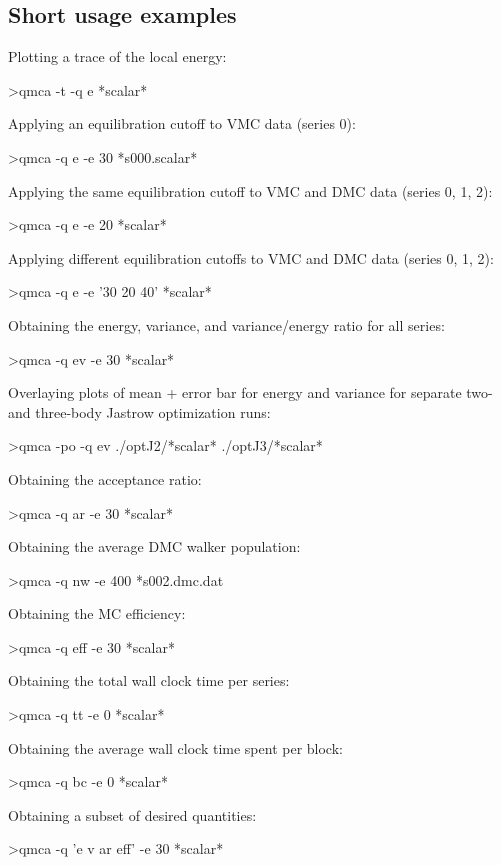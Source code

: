 \subsection{Short usage examples}
\label{sec:qmca_short_examples}
\noindent
Plotting a trace of the local energy:
\begin{shade}
>qmca -t -q e *scalar*
\end{shade}
\noindent
Applying an equilibration cutoff to VMC data (series 0):
\begin{shade}
>qmca -q e -e 30 *s000.scalar*
\end{shade}
\noindent
Applying the same equilibration cutoff to VMC and DMC data (series 0, 1, 2):
\begin{shade}
>qmca -q e -e 20 *scalar*
\end{shade}
\noindent
Applying different equilibration cutoffs to VMC and DMC data (series 0, 1, 2):
\begin{shade}
>qmca -q e -e '30 20 40' *scalar*
\end{shade}
\noindent
Obtaining the energy, variance, and variance/energy ratio for all series:
\begin{shade}
>qmca -q ev -e 30 *scalar*
\end{shade}
\noindent
Overlaying plots of mean + error bar for energy and variance for separate 
two- and three-body Jastrow optimization runs:
\begin{shade}
>qmca -po -q ev ./optJ2/*scalar* ./optJ3/*scalar*
\end{shade}
\noindent
Obtaining the acceptance ratio:
\begin{shade}
>qmca -q ar -e 30 *scalar*
\end{shade}
\noindent
Obtaining the average DMC walker population:
\begin{shade}
>qmca -q nw -e 400 *s002.dmc.dat
\end{shade}
\noindent
Obtaining the MC efficiency:
\begin{shade}
>qmca -q eff -e 30 *scalar*
\end{shade}
\noindent
Obtaining the total wall clock time per series:
\begin{shade}
>qmca -q tt -e 0 *scalar*
\end{shade}
\noindent
Obtaining the average wall clock time spent per block:
\begin{shade}
>qmca -q bc -e 0 *scalar*
\end{shade}
\noindent
Obtaining a subset of desired quantities:
\begin{shade}
>qmca -q 'e v ar eff' -e 30 *scalar*
\end{shade}
